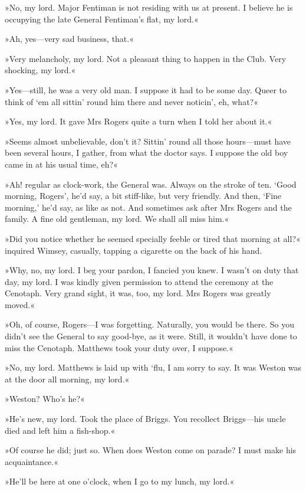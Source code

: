 »No, my lord. Major Fentiman is not residing with us at present. I believe he is occupying the late General Fentiman's flat, my lord.«

»Ah, yes—very sad business, that.«

»Very melancholy, my lord. Not a pleasant thing to happen in the Club. Very shocking, my lord.«

»Yes—still, he was a very old man. I suppose it had to be some day. Queer to think of `em all sittin' round him there and never noticin', eh, what?«

»Yes, my lord. It gave Mrs Rogers quite a turn when I told her about it.«

»Seems almost unbelievable, don't it? Sittin' round all those hours—must have been several hours, I gather, from what the doctor says. I suppose the old boy came in at his usual time, eh?«

»Ah! regular as clock-work, the General was. Always on the stroke of ten. `Good morning, Rogers', he'd say, a bit stiff-like, but very friendly. And then, `Fine morning,' he'd say, as like as not. And sometimes ask after Mrs Rogers and the family. A fine old gentleman, my lord. We shall all miss him.«

»Did you notice whether he seemed specially feeble or tired that morning at all?« inquired Wimsey, casually, tapping a cigarette on the back of his hand.

»Why, no, my lord. I beg your pardon, I fancied you knew. I wasn't on duty that day, my lord. I was kindly given permission to attend the ceremony at the Cenotaph. Very grand sight, it was, too, my lord. Mrs Rogers was greatly moved.«

»Oh, of course, Rogers—I was forgetting. Naturally, you would be there. So you didn't see the General to say good-bye, as it were. Still, it wouldn't have done to miss the Cenotaph. Matthews took your duty over, I suppose.«

»No, my lord. Matthews is laid up with `flu, I am sorry to say. It was Weston was at the door all morning, my lord.«

»Weston? Who's he?«

»He's new, my lord. Took the place of Briggs. You recollect Briggs—his uncle died and left him a fish-shop.«

»Of course he did; just so. When does Weston come on parade? I must make his acquaintance.«

»He'll be here at one o'clock, when I go to my lunch, my lord.«

